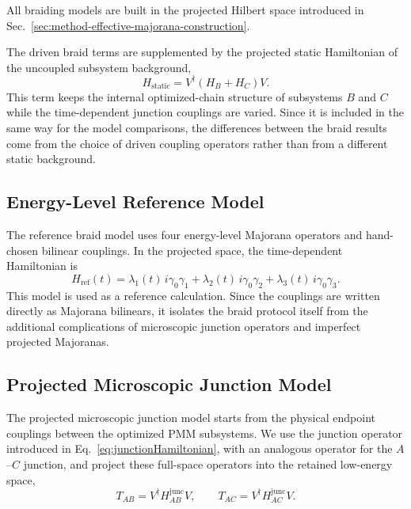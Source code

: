 All braiding models are built in the projected Hilbert space introduced in Sec.~\ref{sec:method-effective-majorana-construction}.

The driven braid terms are supplemented by the projected static Hamiltonian of the uncoupled subsystem background,
\begin{equation}
H_{\mathrm{static}}
=
V^\dagger\left(H_B+H_C\right)V.
\end{equation}
This term keeps the internal optimized-chain structure of subsystems $B$ and $C$ while the time-dependent junction couplings are varied. Since it is included in the same way for the model comparisons, the differences between the braid results come from the choice of driven coupling operators rather than from a different static background.

\subsection{Energy-Level Reference Model}
The reference braid model uses four energy-level Majorana operators and hand-chosen bilinear couplings. In the projected space, the time-dependent Hamiltonian is
\begin{equation}
H_{\mathrm{ref}}(t)
=
\lambda_1(t)\, i\gamma_0\gamma_1
+
\lambda_2(t)\, i\gamma_0\gamma_2
+
\lambda_3(t)\, i\gamma_0\gamma_3 .
\label{eq:method_ideal_braid_hamiltonian}
\end{equation}
This model is used as a reference calculation. Since the couplings are written directly as Majorana bilinears, it isolates the braid protocol itself from the additional complications of microscopic junction operators and imperfect projected Majoranas.

\subsection{Projected Microscopic Junction Model}
The projected microscopic junction model starts from the physical endpoint
couplings between the optimized PMM subsystems. We use the junction operator
introduced in Eq.~\ref{eq:junctionHamiltonian}, with an analogous operator for
the $A$--$C$ junction, and project these full-space operators into the retained
low-energy space,
\begin{equation}
T_{AB}=V^\dagger H^{\mathrm{junc}}_{AB}V,
\qquad
T_{AC}=V^\dagger H^{\mathrm{junc}}_{AC}V .
\label{eq:method_projected_junctions}
\end{equation}

